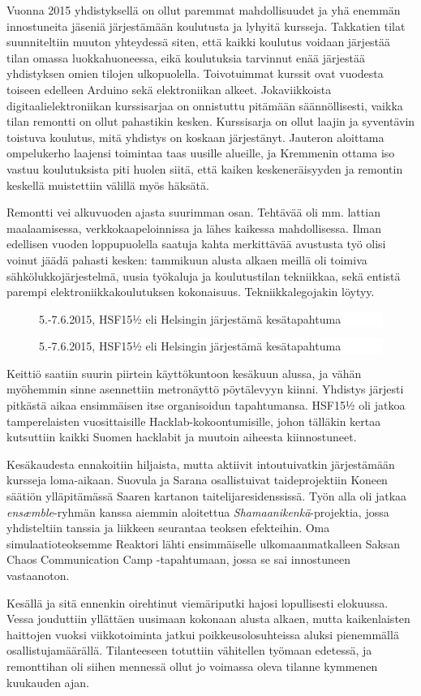 \documentclass[a4paper]{memoir}
\newcommand{\varitys}{white}
\newlength{\aXa}
\newlength{\aXb}
\newcommand{\jana}[1]{
        \setlength{\aXa}{4cm}
        \setlength{\aXb}{0.4\textwidth}
   \ifodd\value{page}
        \begin{figure}\vspace{-7pt} \hspace{5pt} \colorbox{\varitys}{\parbox{\aXb}{   \textsf{{#1}}  }} \vspace{-7pt}\end{figure}
     \else
        \begin{figure}\vspace{-7pt}    \hspace{-5pt}  \colorbox{\varitys}{\parbox{\aXb}{   \textsf{{#1}} }} \vspace{-7pt}\end{figure}
     \fi
}
\begin{document}
Vuonna 2015 yhdistyksellä on ollut paremmat mahdollisuudet ja yhä enemmän innostuneita jäseniä järjestämään koulutusta ja lyhyitä kursseja. Takkatien tilat suunniteltiin muuton yhteydessä siten, että kaikki koulutus voidaan järjestää tilan omassa luokkahuoneessa, eikä koulutuksia tarvinnut enää järjestää yhdistyksen omien tilojen ulkopuolella. Toivotuimmat kurssit ovat vuodesta toiseen edelleen Arduino sekä elektroniikan alkeet. Jokaviikkoista digitaalielektroniikan kurssisarjaa on onnistuttu pitämään säännöllisesti, vaikka tilan remontti on ollut pahastikin kesken. Kurssisarja on ollut laajin ja syventävin toistuva koulutus, mitä yhdistys on koskaan järjestänyt. Jauteron aloittama ompelukerho laajensi toimintaa taas uusille alueille, ja Kremmenin ottama iso vastuu koulutuksista piti huolen siitä, että kaiken keskeneräisyyden ja remontin keskellä muistettiin välillä myös häksätä.

Remontti vei alkuvuoden ajasta suurimman osan. Tehtävää oli mm. lattian maalaamisessa, verkkokaapeloinnissa ja lähes kaikessa mahdollisessa. Ilman edellisen vuoden loppupuolella saatuja kahta merkittävää avustusta työ olisi voinut jäädä pahasti kesken: tammikuun alusta alkaen meillä oli toimiva sähkölukkojärjestelmä, uusia työkaluja ja koulutustilan tekniikkaa, sekä entistä parempi elektroniikkakoulutuksen kokonaisuus. Tekniikkalegojakin löytyy.

\jana{5.-7.6.2015, HSF15½ eli Helsingin järjestämä kesätapahtuma}

Keittiö saatiin suurin piirtein käyttökuntoon kesäkuun alussa, ja vähän myöhemmin sinne asennettiin metronäyttö pöytälevyyn kiinni. Yhdistys järjesti pitkästä aikaa ensimmäisen itse organisoidun tapahtumansa. HSF15½ oli jatkoa tamperelaisten vuosittaisille Hacklab-kokoontumisille, johon tälläkin kertaa kutsuttiin kaikki Suomen hacklabit ja muutoin aiheesta kiinnostuneet.

Kesäkaudesta ennakoitiin hiljaista, mutta aktiivit intoutuivatkin järjestämään kursseja loma-aikaan. Suovula ja Sarana osallistuivat taideprojektiin Koneen säätiön ylläpitämässä Saaren kartanon taitelijaresidenssissä. Työn alla oli jatkaa \textit{ensæmble}-ryhmän kanssa aiemmin aloitettua \textit{Shamaanikenkä}-projektia, jossa yhdisteltiin tanssia ja liikkeen seurantaa teoksen efekteihin. Oma simulaatioteoksemme Reaktori lähti ensimmäiselle ulkomaanmatkalleen Saksan Chaos Communication Camp -tapahtumaan, jossa se sai innostuneen vastaanoton.

Kesällä ja sitä ennenkin oirehtinut viemäriputki hajosi lopullisesti elokuussa. Vessa jouduttiin yllättäen uusimaan kokonaan alusta alkaen, mutta kaikenlaisten haittojen vuoksi viikkotoiminta jatkui poikkeusolosuhteissa aluksi pienemmällä osallistujamäärällä. Tilanteeseen totuttiin vähitellen työmaan edetessä, ja remonttihan oli siihen mennessä ollut jo voimassa oleva tilanne kymmenen kuukauden ajan.
\end{document}
